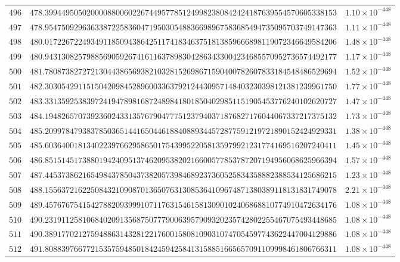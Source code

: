 \documentclass[12pt,reqno]{amsart}
\theoremstyle{remark}
\begin{document}
\begin{longtable}{clc}
$496$ & $478.3994495050200008800602267449577851249982380842424187639554570605338153$ & $1.10\times 10^{-448}$ \\
$497$ & $478.9547509296363387225836047195030548836698967583685494735095703749147363$ & $1.11\times 10^{-448}$ \\
$498$ & $480.0172267224934911850943864251174183463751813859666898119072346649584206$ & $1.48\times 10^{-448}$ \\
$499$ & $480.9431308257988569059267416116378983042863433004234685570952736574492177$ & $1.17\times 10^{-448}$ \\
$500$ & $481.7808738272721304438656938210328152698671590400782607833184548486529694$ & $1.52\times 10^{-448}$ \\
$501$ & $482.3030542911515042098452896003363792124430957148403230398121381239961750$ & $1.77\times 10^{-448}$ \\
$502$ & $483.3313592538397241947898168724898418018504029851151905453776240102620727$ & $1.47\times 10^{-448}$ \\
$503$ & $484.1948265707392360243313576790477751237940371876827176044067337217375132$ & $1.73\times 10^{-448}$ \\
$504$ & $485.2099784793837850365144165044618840889344572877591219721890152424929331$ & $1.38\times 10^{-448}$ \\
$505$ & $485.6036400181340223976629586501754399522058135979921231774169516207240411$ & $1.45\times 10^{-448}$ \\
$506$ & $486.8515145173880194240951374620953820216600577853787207194956068625966394$ & $1.57\times 10^{-448}$ \\
$507$ & $487.4453738621654984378504373820573984689237360525834358882388534125686215$ & $1.23\times 10^{-448}$ \\
$508$ & $488.1556372162250843210908701365076313085364109674871380389118131831749078$ & $2.21\times 10^{-448}$ \\
$509$ & $489.4576767541542788209399910711763154615813090102406868810774910472634176$ & $1.08\times 10^{-448}$ \\
$510$ & $490.2319112581068402091356875077790063957909320235742802255467075493448685$ & $1.08\times 10^{-448}$ \\
$511$ & $490.3891770212759488631432812217600158081090310747054597743622447004129886$ & $1.08\times 10^{-448}$ \\
$512$ & $491.8088397667721535759485018424594258413158851665657091109998461806766311$ & $1.08\times 10^{-448}$ \\

\end{longtable}
\end{document}
